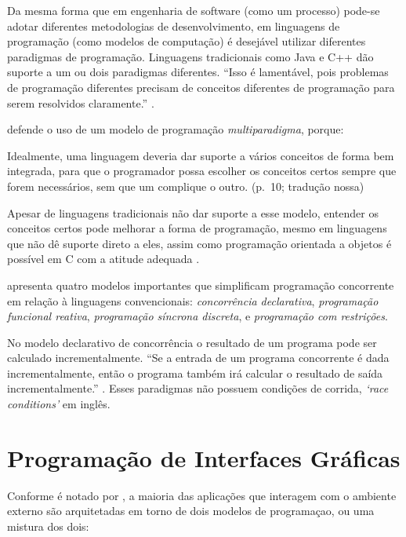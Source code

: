 Da mesma forma que em engenharia de software (como um processo) pode-se adotar
diferentes metodologias de desenvolvimento, em linguagens de programação (como
modelos de computação) é desejável utilizar diferentes paradigmas de
programação.
Linguagens tradicionais como Java e C++ dão suporte a um ou dois paradigmas
diferentes.
“Isso é lamentável, pois problemas de programação diferentes precisam de
conceitos diferentes de programação para serem resolvidos claramente.”
\cite[p. 10]{roy2009}.

\textcite{roy2009} defende o uso de um modelo de programação \emph{multiparadigma},
porque:

\begin{citacao}
  Idealmente, uma linguagem deveria dar suporte a vários conceitos de forma
  bem integrada, para que o programador possa escolher os conceitos certos
  sempre que forem necessários, sem que um complique o outro.
  (p.~10; tradução nossa)
\end{citacao}

Apesar de linguagens tradicionais não dar suporte a esse modelo, entender os
conceitos certos pode melhorar a forma de programação, mesmo em linguagens que
não dê suporte direto a eles, assim como programação orientada a objetos é
possível em C com a atitude adequada \cite{roy2009}.

\textcite{roy2009} apresenta quatro modelos importantes que simplificam
programação concorrente em relação à linguagens convencionais: \emph{concorrência
declarativa}, \emph{programação funcional reativa}, \emph{programação síncrona
discreta}, e \emph{programação com restrições}.

No modelo declarativo de concorrência o resultado de um programa pode ser
calculado incrementalmente.
“Se a entrada de um programa concorrente é dada incrementalmente, então o
programa também irá calcular o resultado de saída incrementalmente.”
\cite[p. 238; tradução nossa]{roy2004}.
Esses paradigmas não possuem condições de corrida, \emph{‘race conditions’} em
inglês.

\section{Programação de Interfaces Gráficas}
\label{sec:orga431335}

Conforme é notado por \textcite{blackheath2016}, a maioria das aplicações que
interagem com o ambiente externo são arquitetadas em torno de dois modelos de
programaçao, ou uma mistura dos dois:

